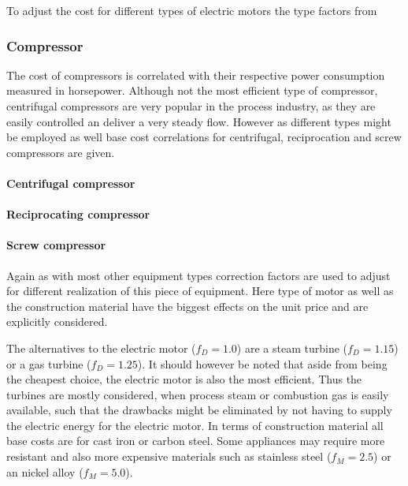 			To adjust the cost for different types of electric motors the type factors from 
			
	
	\subsubsection{Compressor}
		The cost of compressors is correlated with their respective power consumption measured in horsepower.
		Although not the most efficient type of compressor, centrifugal compressors are very popular in the
		process industry, as they are easily controlled an deliver a very steady flow. However as different
		types might be employed as well base cost correlations for centrifugal, reciprocation and screw
		compressors are given.
		
			\paragraph{Centrifugal compressor}
			
			\paragraph{Reciprocating compressor}
				
			\paragraph{Screw compressor}
		
		Again as with most other equipment types correction factors are used to adjust for different realization
		of this piece of equipment. Here type of motor as well as the construction material have the biggest
		effects on the unit price and are explicitly considered.
		
		The alternatives to the electric motor ($f_D = 1.0$) are a steam turbine ($f_D = 1.15$) or a gas turbine
		($f_D = 1.25$). It should however be noted that aside from being the cheapest choice, the electric motor
		is also the most efficient. Thus the turbines are mostly considered, when process steam or combustion gas
		is easily available, such that the drawbacks might be eliminated by not having to supply the electric
		energy for the electric motor. In terms of construction material all base costs are for cast iron or
		carbon steel. Some appliances may require more resistant and also more expensive materials such as
		stainless steel ($f_M = 2.5$) or an nickel alloy ($f_M = 5.0$).
		
